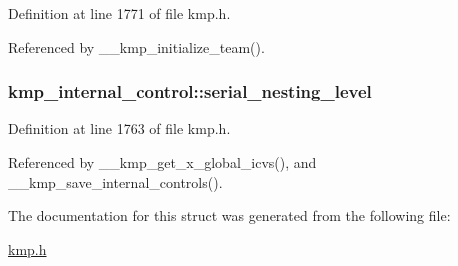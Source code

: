 Definition at line 1771 of file kmp.\-h.



Referenced by \-\_\-\-\_\-kmp\-\_\-initialize\-\_\-team().

\hypertarget{structkmp__internal__control_aace7f1175db32707e8ad500ed5aea229}{
\subsubsection[{serial\-\_\-nesting\-\_\-level}]{ kmp\-\_\-internal\-\_\-control\-::serial\-\_\-nesting\-\_\-level}}\label{structkmp__internal__control_aace7f1175db32707e8ad500ed5aea229}


Definition at line 1763 of file kmp.\-h.



Referenced by \-\_\-\-\_\-kmp\-\_\-get\-\_\-x\-\_\-global\-\_\-icvs(), and \-\_\-\-\_\-kmp\-\_\-save\-\_\-internal\-\_\-controls().



The documentation for this struct was generated from the following file\-:\begin{DoxyCompactItemize}
\item 
\hyperlink{kmp_8h}{kmp.\-h}\end{DoxyCompactItemize}

